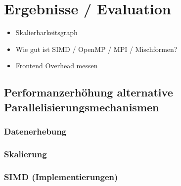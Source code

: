 \section{Ergebnisse / Evaluation}
\begin{itemize}
	\item Skalierbarkeitsgraph
	\item Wie gut ist SIMD / OpenMP / MPI / Mischformen?
	\item Frontend Overhead messen
\end{itemize}



\subsection{Performanzerhöhung alternative Parallelisierungsmechanismen}

\subsubsection{Datenerhebung}

\subsubsection{Skalierung}





\subsubsection{SIMD (Implementierungen)}

